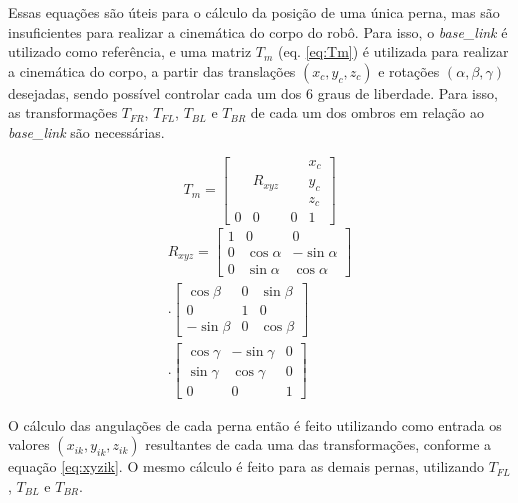 \documentclass[../main.tex]{subfiles}
\begin{document}
Essas equações são úteis para o cálculo da posição de uma única perna, mas são insuficientes para realizar a cinemática do corpo do robô. Para isso, o \textit{base\_link} é utilizado como referência, e uma matriz $T_m$ (eq. \ref{eq:Tm}) é utilizada para realizar a cinemática do corpo, a partir das translações $(x_c, y_c, z_c)$ e rotações $(\alpha, \beta, \gamma)$ desejadas, sendo possível controlar cada um dos 6 graus de liberdade. Para isso, as transformações $T_{FR}$, $T_{FL}$, $T_{BL}$ e $T_{BR}$ de cada um dos ombros em relação ao \textit{base\_link} são necessárias.

\begin{equation}
  \label{eq:Tm}
  T_m =
  \begin{bmatrix}
      &         &   & x_c \\
      & R_{xyz} &   & y_c \\
      &         &   & z_c \\
    0 & 0       & 0 & 1
  \end{bmatrix}
\end{equation}
\begin{equation}
  \label{eq:Rxyz}
  \begin{split}
    R_{xyz} =
    \begin{bmatrix}
      1 & 0          & 0           \\
      0 & \cos\alpha & -\sin\alpha \\
      0 & \sin\alpha & \cos\alpha
    \end{bmatrix}
    \\.
    \begin{bmatrix}
      \cos\beta  & 0 & \sin\beta \\
      0          & 1 & 0         \\
      -\sin\beta & 0 & \cos\beta
    \end{bmatrix}
    \\.
    \begin{bmatrix}
      \cos\gamma & -\sin\gamma & 0 \\
      \sin\gamma & \cos\gamma  & 0 \\
      0          & 0           & 1
    \end{bmatrix}
  \end{split}
\end{equation}

O cálculo das angulações de cada perna então é feito utilizando como entrada os valores $(x_{ik}, y_{ik}, z_{ik})$ resultantes de cada uma das transformações, conforme a equação \ref{eq:xyzik}. O mesmo cálculo é feito para as demais pernas, utilizando  $T_{FL}$, $T_{BL}$ e $T_{BR}$.
\end{document}
